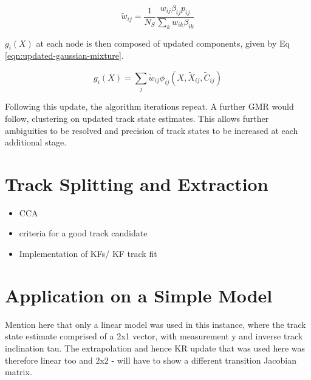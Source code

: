 \begin{equation}
\widetilde{w}_{ij} = \frac{1}{N_S} \frac{w_{ij}\beta_{ij} p_{ij}}{\sum_{k}w_{ik}\beta_{ik}}
\label{eqn:weights}
\end{equation}

$g_i(X)$ at each node is then composed of updated components, given by Eq \eqref{eqn:updated-gaussian-mixture}.

\begin{equation}
g_i(X) = \sum_{j} \widetilde{w}_{ij}\phi_{ij}(X, \widetilde{X}_{ij}, \widetilde{C}_{ij})
\label{eqn:updated-gaussian-mixture}
\end{equation}

Following this update, the algorithm iterations repeat. A further GMR would follow, clustering on updated track state estimates. This allows further ambiguities to be resolved and precision of track states to be increased at each additional stage.




\section{Track Splitting and Extraction}
\label{gnn-track-extration}
\begin{itemize}
    \item CCA
    \item criteria for a good track candidate
    \item Implementation of KFs/ KF track fit
\end{itemize}




\section{Application on a Simple Model}
\label{gnn-application-toy-model}

Mention here that only a linear model was used in this instance, where the track state estimate comprised of a 2x1 vector, with measurement y and inverse track inclination tau. The extrapolation and hence KR update that was used here was therefore linear too and 2x2 - will have to show a different transition Jacobian matrix.



